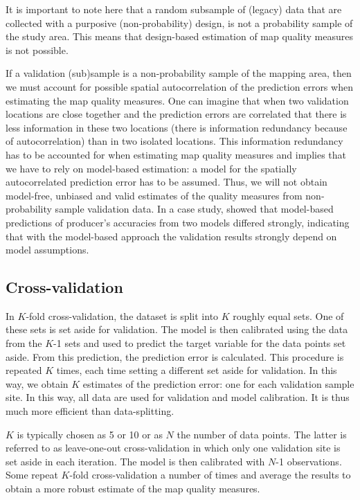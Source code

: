 \documentclass[10pt,b5paper,]{book}
\theoremstyle{definition}
\theoremstyle{definition}
\theoremstyle{definition}
\theoremstyle{remark}
\begin{document}
It is important to note here that a random subsample of (legacy) data
that are collected with a purposive (non-probability) design, is not a
probability sample of the study area. This means that design-based
estimation of map quality measures is not possible.

If a validation (sub)sample is a non-probability sample of the mapping
area, then we must account for possible spatial autocorrelation of the
prediction errors when estimating the map quality measures. One can
imagine that when two validation locations are close together and the
prediction errors are correlated that there is less information in these
two locations (there is information redundancy because of
autocorrelation) than in two isolated locations. This information
redundancy has to be accounted for when estimating map quality measures
and implies that we have to rely on model-based estimation: a model for
the spatially autocorrelated prediction error has to be assumed. Thus,
we will not obtain model-free, unbiased and valid estimates of the
quality measures from non-probability sample validation data. In a case
study, \citet{knotters2013purposive} showed that model-based predictions
of producer's accuracies from two models differed strongly, indicating
that with the model-based approach the validation results strongly
depend on model assumptions.

\hypertarget{xval}{%
\subsection{Cross-validation}\label{xval}}

In \(K\)-fold cross-validation, the dataset is split into \(K\) roughly
equal sets. One of these sets is set aside for validation. The model is
then calibrated using the data from the \(K\)-1 sets and used to predict
the target variable for the data points set aside. From this prediction,
the prediction error is calculated. This procedure is repeated \(K\)
times, each time setting a different set aside for validation. In this
way, we obtain \(K\) estimates of the prediction error: one for each
validation sample site. In this way, all data are used for validation
and model calibration. It is thus much more efficient than
data-splitting.

\(K\) is typically chosen as 5 or 10 or as \(N\) the number of data
points. The latter is referred to as leave-one-out cross-validation in
which only one validation site is set aside in each iteration. The model
is then calibrated with \(N\)-1 observations. Some repeat \(K\)-fold
cross-validation a number of times and average the results to obtain a
more robust estimate of the map quality measures.
\end{document}
